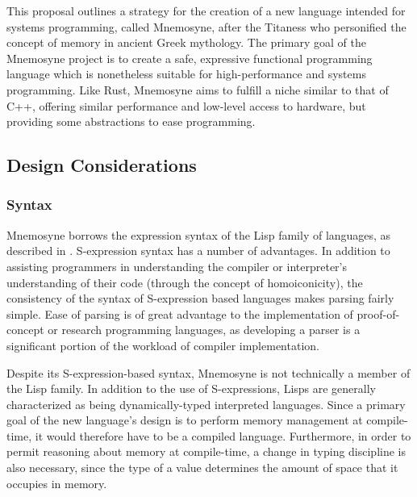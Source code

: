 \documentclass[11pt,a4paper]{article}
\theoremstyle{break}
\begin{document}
This proposal outlines a strategy for the creation of a new language intended for systems programming, called Mnemosyne, after the Titaness who personified the concept of memory in ancient Greek mythology. The primary goal of the Mnemosyne project is to create a safe, expressive functional programming language which is nonetheless suitable for high-performance and systems programming. Like Rust, Mnemosyne aims to fulfill a niche similar to that of C++, offering similar performance and low-level access to hardware, but providing some abstractions to ease programming.

\subsection{Design Considerations}

\subsubsection{Syntax}

Mnemosyne borrows the expression syntax of the Lisp family of languages, as described in . S-expression syntax has a number of advantages. In addition to assisting programmers in understanding the compiler or interpreter's understanding of their code (through the concept of homoiconicity), the consistency of the syntax of S-expression based languages makes parsing fairly simple. Ease of parsing is of great advantage to the implementation of proof-of-concept or research programming languages, as developing a parser is a significant portion of the workload of compiler implementation.

Despite its S-expression-based syntax, Mnemosyne is not technically a member of the Lisp family. In addition to the use of S-expressions, Lisps are generally characterized as being dynamically-typed interpreted languages. Since a primary goal of the new language's design is to perform memory management at compile-time, it would therefore have to be a compiled language. Furthermore, in order to permit reasoning about memory at compile-time, a change in typing discipline is also necessary, since the type of a value determines the amount of space that it occupies in memory.
\end{document}
